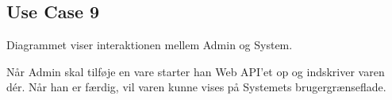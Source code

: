 \subsection{Use Case 9}
Diagrammet viser interaktionen mellem Admin og System.


Når Admin skal tilføje en vare starter han Web API'et op og indskriver varen dér. Når han er færdig, vil varen kunne vises på Systemets brugergrænseflade. 